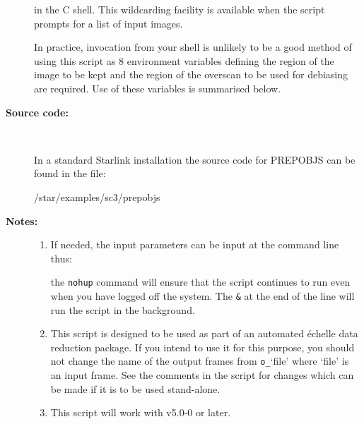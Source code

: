 \documentclass[twoside,11pt]{starlink}
\begin{document}
\begin{description}
\begin{terminalv}
\end{terminalv}

     in the C shell.  This wildcarding facility is available when the
     script prompts for a list of input images.

     In practice, invocation from your shell is unlikely to be a good
     method of using this script as 8 environment variables defining
     the region of the image to be kept and the region of the overscan
     to be used for debiasing are required.  Use of these variables is
     summarised below.

\item [\textbf{Source code:}] \mbox{} \\
\begin{latexonly}
In a standard Starlink installation the source code for PREPOBJS can be found
in the file:
\begin{terminalv}
   /star/examples/sc3/prepobjs
\end{terminalv}
\end{latexonly}



\item [\textbf{Notes:}] \mbox{}
\begin{enumerate}

\item If needed, the input parameters can be input at the command
      line thus:

\begin{terminalv}
\end{terminalv}

      the \verb+nohup+ command will ensure that the script continues
      to run even when you have logged off the system.  The \verb+&+ at
      the end of the line will run the script in the background.

\item This script is designed to be used as part of an automated
      \'{e}chelle data reduction package.  If you intend to use it
      for this purpose, you should not change the name of the output
      frames from \verb+o_+`file' where `file' is an input frame.  See the
      comments in the script for changes which can be made if it is
      to be used stand-alone.

\item This script will work with  v5.0-0 or later.


\end{enumerate}
\end{description}
\end{document}
